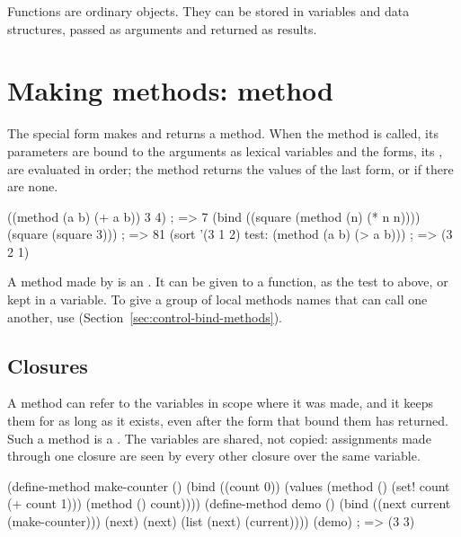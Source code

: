 \noindent Functions are ordinary objects. They can be stored in variables
and data structures, passed as arguments and returned as results.

\section{Making methods: method}\label{sec:functions-method}

\begin{quote}
\end{quote}

\noindent The special form  makes and returns a method. When
the method is called, its parameters are bound to the arguments as lexical
variables and the forms, its , are evaluated in order; the
method returns the values of the last form, or  if there are none.

\begin{dylan}
((method (a b) (+ a b)) 3 4)             ; => 7
(bind ((square (method (n) (* n n))))
  (square (square 3)))                   ; => 81
(sort '(3 1 2) test: (method (a b) (> a b)))   ; => (3 2 1)
\end{dylan}

\noindent A method made by  is an . It
can be given to a function, as the test to  above, or kept in a
variable. To give a group of local methods names that can call one another,
use  (Section~\ref{sec:control-bind-methods}).

\subsection{Closures}\label{sec:functions-closures}

A method can refer to the variables in scope where it was made, and it
keeps them for as long as it exists, even after the form that bound them
has returned. Such a method is a . The variables are shared,
not copied: assignments made through one closure are seen by every other
closure over the same variable.

\begin{dylan}
(define-method make-counter ()
  (bind ((count 0))
    (values (method () (set! count (+ count 1)))
            (method () count))))
(define-method demo ()
  (bind ((next current (make-counter)))
    (next)
    (next)
    (list (next) (current))))
(demo)                         ; => (3 3)
\end{dylan}

